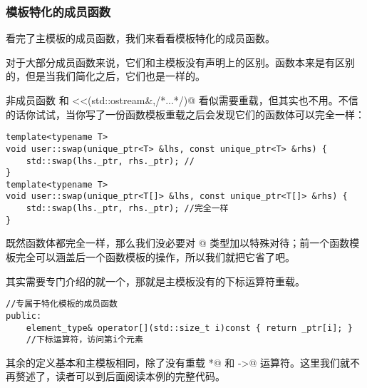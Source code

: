 \subsubsection*{模板特化的成员函数}
看完了主模板的成员函数，我们来看看模板特化的成员函数。\par
对于大部分成员函数来说，它们和主模板没有声明上的区别。\lstinline@reset@ 函数本来是有区别的，但是当我们简化之后，它们也是一样的。\par
非成员函数 \lstinline@swap@ 和 \lstinline@operator<<(std::ostream&,/*...*/)@ 看似需要重载，但其实也不用。不信的话你试试，当你写了一份函数模板重载之后会发现它们的函数体可以完全一样：
\begin{lstlisting}
template<typename T>
void user::swap(unique_ptr<T> &lhs, const unique_ptr<T> &rhs) {
    std::swap(lhs._ptr, rhs._ptr); //
}
template<typename T>
void user::swap(unique_ptr<T[]> &lhs, const unique_ptr<T[]> &rhs) {
    std::swap(lhs._ptr, rhs._ptr); //完全一样
}
\end{lstlisting}
既然函数体都完全一样，那么我们没必要对 \lstinline@T[]@ 类型加以特殊对待；前一个函数模板完全可以涵盖后一个函数模板的操作，所以我们就把它省了吧。\par
其实需要专门介绍的就一个，那就是主模板没有的下标运算符重载。
\begin{lstlisting}
//专属于特化模板的成员函数
public:
    element_type& operator[](std::size_t i)const { return _ptr[i]; }
    //下标运算符，访问第i个元素
\end{lstlisting}\par
其余的定义基本和主模板相同，除了没有重载 \lstinline@*@ 和 \lstinline@->@ 运算符。这里我们就不再赘述了，读者可以到后面阅读本例的完整代码。\par
